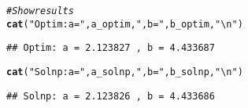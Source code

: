 \documentclass{article}\usepackage[]{graphicx}\usepackage[]{xcolor}
\makeatletter
\newcommand{\hlsng}[1]{\textcolor[rgb]{0.192,0.494,0.8}{#1}}%
\newcommand{\hlcom}[1]{\textcolor[rgb]{0.678,0.584,0.686}{\textit{#1}}}%
\newcommand{\hldef}[1]{\textcolor[rgb]{0.345,0.345,0.345}{#1}}%
\newcommand{\hlkwd}[1]{\textcolor[rgb]{0.737,0.353,0.396}{\textbf{#1}}}%
\newenvironment{kframe}{%
 \def\at@end@of@kframe{}%
 \ifinner\ifhmode%
  \def\at@end@of@kframe{\end{minipage}}%
  \begin{minipage}{\columnwidth}%
 \fi\fi%
 \def\FrameCommand##1{\hskip\@totalleftmargin \hskip-\fboxsep
 \colorbox{shadecolor}{##1}\hskip-\fboxsep
     \hskip-\linewidth \hskip-\@totalleftmargin \hskip\columnwidth}%
 \MakeFramed {\advance\hsize-\width
   \@totalleftmargin\z@ \linewidth\hsize
   \@setminipage}}%
 {\par\unskip\endMakeFramed%
 \at@end@of@kframe}
\newenvironment{knitrout}{}{} %
\makeatother
\begin{document}
\begin{knitrout}
\begin{kframe}
\begin{alltt}
\hlcom{# Show results}
\hlkwd{cat}\hldef{(}\hlsng{"Optim: a ="}\hldef{, a_optim,} \hlsng{", b ="}\hldef{, b_optim,} \hlsng{"\textbackslash{}n"}\hldef{)}
\end{alltt}
\begin{verbatim}
## Optim: a = 2.123827 , b = 4.433687
\end{verbatim}
\begin{alltt}
\hlkwd{cat}\hldef{(}\hlsng{"Solnp: a ="}\hldef{, a_solnp,} \hlsng{", b ="}\hldef{, b_solnp,} \hlsng{"\textbackslash{}n"}\hldef{)}
\end{alltt}
\begin{verbatim}
## Solnp: a = 2.123826 , b = 4.433686
\end{verbatim}
\end{kframe}
\end{knitrout}
\end{document}
